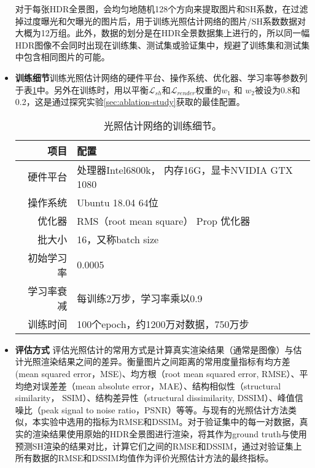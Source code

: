 \begin{itemize}
    对于每张HDR全景图，会均匀地随机128个方向来提取图片和SH系数，在过滤掉过度曝光和欠曝光的图片后，用于训练光照估计网络的图片/SH系数数据对大概为12万组。此外，数据的划分是在HDR全景数据集上进行的，所以同一幅HDR图像不会同时出现在训练集、测试集或验证集中，规避了训练集和测试集中包含相同图片的可能。
    \item \textbf{训练细节}训练光照估计网络的硬件平台、操作系统、优化器、学习率等参数列于表\ref{table:traning-details}中。另外在训练时，用以平衡$\mathcal{L}_{sh}$和$\mathcal{L}_{render}$权重的$w_1$ 和 $w_2$被设为0.8和0.2，这是通过探究实验\ref{sec:ablation-study}获取的最佳配置。
    \begin{table}[htbp]
        \centering
        \begin{tabular}{r|l}
            \hline
            项目 & 配置\\
            \hline
            硬件平台 & 处理器Intel6800k， 内存16G，显卡NVIDIA GTX 1080\\
            操作系统 & Ubuntu 18.04 64位\\
            优化器    & RMS（root mean square） Prop 优化器\\
            批大小    & 16，又称batch size\\
            初始学习率 & 0.0005 \\
            学习率衰减 & 每训练2万步，学习率乘以0.9\\
            训练时间 & 100个epoch，约1200万对数据，750万步\\
            \hline            
        \end{tabular}
        \caption{\label{table:traning-details}
            光照估计网络的训练细节。
        }
    \end{table}
    \item \textbf{评估方式} 评估光照估计的常用方式是计算真实渲染结果（通常是图像）与估计光照渲染结果之间的差异。衡量图片之间距离的常用度量指标有均方差(mean squared error，MSE)、均方根（root mean squared error, RMSE）、平均绝对误差差（mean absolute  error，MAE）、结构相似性（structural similarity， SSIM）、结构差异性（structural dissimilarity, DSSIM）、峰值信噪比（peak signal to noise ratio，PSNR）等等。与现有的光照估计方法类似，本实验中选用的指标为RMSE和DSSIM。对于验证集中的每一对数据，真实的渲染结果使用原始的HDR全景图进行渲染，将其作为ground truth与使用预测SH渲染的结果对比，计算它们之间的RMSE和DSSIM，通过对验证集上所有数据的RMSE和DSSIM均值作为评价光照估计方法的最终指标。
\end{itemize}
